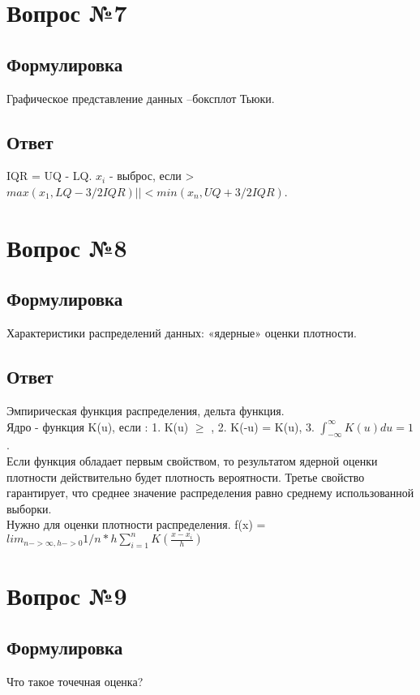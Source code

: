 \documentclass[a4]{article}
\begin{document}
	\section{Вопрос №7}
	\subsection*{Формулировка}
	Графическое представление данных –боксплот Тьюки.
	\subsection*{Ответ}
	IQR = UQ - LQ. $x_i$ - выброс, если > $max(x_1, LQ - 3/2 IQR) || < min(x_n, UQ + 3/2 IQR)$.
	
	\section{Вопрос №8}
	\subsection*{Формулировка}
	Характеристики распределений данных: «ядерные» оценки плотности.
	\subsection*{Ответ}
	Эмпирическая функция распределения, дельта функция.\\
	Ядро - функция K(u), если : 1. K(u) $\geq$ , 2. K(-u) = K(u), 3. $\int_{-\infty}^{\infty} K(u) du = 1$.\\
	Если функция обладает первым свойством, то результатом ядерной оценки плотности действительно будет плотность вероятности. Третье свойство гарантирует, что среднее значение распределения равно среднему использованной выборки.\\
	Нужно для оценки плотности распределения. f(x) = $lim_{n -> \infty, h -> 0} 1/n * h \sum_{i = 1}^n K(\frac{x-x_i}{h})$
	
	\section{Вопрос №9}
	\subsection*{Формулировка}
	Что такое точечная оценка?
\end{document}
